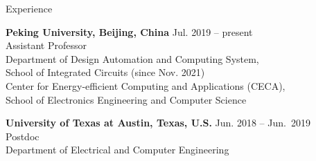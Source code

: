 
\begin{rSection}{Experience}

{\bf Peking University, Beijing, China}                           \hfill {Jul. 2019 -- present} \\
Assistant Professor \\
Department of Design Automation and Computing System, \\
School of Integrated Circuits (since Nov. 2021) \\
Center for Energy-efficient Computing and Applications (CECA), \\
School of Electronics Engineering and Computer Science

{\bf University of Texas at Austin, Texas, U.S.}                           \hfill {Jun. 2018 -- Jun.~2019} \\
Postdoc \\
Department of Electrical and Computer Engineering

%
%
%
%


\end{rSection}


